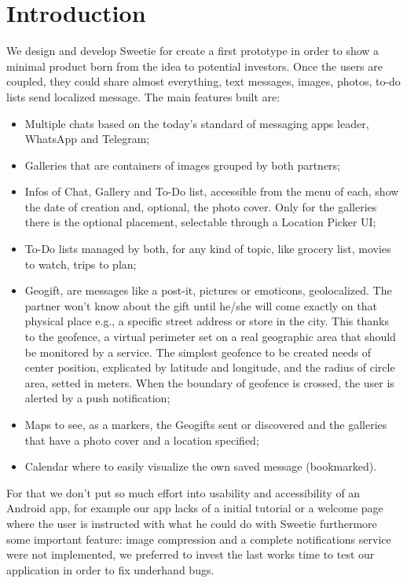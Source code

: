 
\section{Introduction}
\label{sec:introduction}


We design and develop Sweetie for create a first prototype in order to show a minimal product born from the idea to potential investors.
Once the users are coupled, they could share almost everything, text messages, images, photos, to-do lists send localized message. The main features built are:

\begin{itemize}
	\item Multiple chats based on the today’s standard of messaging apps leader, WhatsApp and Telegram;
	\item Galleries that are containers of images grouped by both partners;
	\item Infos of Chat, Gallery and To-Do list, accessible from the menu of each, show the date of creation and, optional, the photo cover. Only for the galleries there is the optional placement, selectable through a Location Picker UI;
	\item To-Do lists managed by both, for any kind of topic, like grocery list, movies to watch, trips to plan;
	\item Geogift, are messages like a post-it, pictures or emoticons, geolocalized. The partner won’t know about the gift until he/she will come exactly on that physical place e.g., a specific street address or store in the city. This thanks to the geofence, a virtual perimeter set on a real geographic area that should be monitored by a service. The simplest geofence to be created needs of center position, explicated by latitude and longitude, and the radius of circle area, setted in meters. When the boundary of geofence is crossed, the user is alerted by a push notification;
	\item Maps to see, as a markers, the Geogifts sent or discovered and the galleries that have a photo cover and a location specified;
	\item Calendar where to easily visualize the own saved message (bookmarked).
\end{itemize}

For that we don’t put so much effort into usability and accessibility of an Android app, for example our app lacks of a initial tutorial or a welcome page where the user is instructed with what he could do with Sweetie furthermore some important feature: image compression and a complete notifications service were not implemented, we preferred to invest the last works time to test our application in order to fix underhand bugs.

